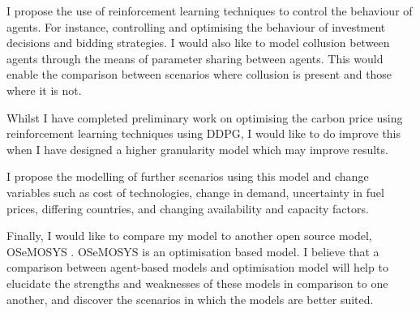\documentclass[12pt]{article}
\begin{document}
I propose the use of reinforcement learning techniques to control the behaviour of agents. For instance, controlling and optimising the behaviour of investment decisions and bidding strategies. I would also like to model collusion between agents through the means of parameter sharing between agents. This would enable the comparison between scenarios where collusion is present and those where it is not.

Whilst I have completed preliminary work on optimising the carbon price using reinforcement learning techniques using DDPG, I would like to do improve this when I have designed a higher granularity model which may improve results.

I propose the modelling of further scenarios using this model and change variables such as cost of technologies, change in demand, uncertainty in fuel prices, differing countries, and changing availability and capacity factors.

Finally, I would like to compare my model to another open source model, OSeMOSYS \cite{Howells2011}. OSeMOSYS is an optimisation based model. I believe that a comparison between agent-based models and optimisation model will help to elucidate the strengths and weaknesses of these models in comparison to one another, and discover the scenarios in which the models are better suited. 
\end{document}
